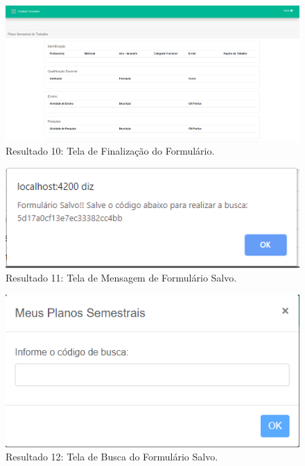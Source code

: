 \begin{figure}[htb]
    \centering
    \includegraphics[width=.8\textwidth]{img/pagina_finalizar.PNG}
    \caption[Resultado 10: Tela de Finalização do Formulário]{Resultado 10: Tela de Finalização do Formulário.}
    \label{fig:result10}
\end{figure}

\begin{figure}[htb]
    \centering
    \includegraphics[width=.8\textwidth]{img/alert_salvar.PNG}
    \caption[Resultado 11: Tela de Mensagem de Formulário Salvo]{Resultado 11: Tela de Mensagem de Formulário Salvo.}
    \label{fig:result11}
\end{figure}

\begin{figure}[htb]
    \centering
    \includegraphics[width=.8\textwidth]{img/pagina_busca.PNG}
    \caption[Resultado 12: Tela de Busca do Formulário Salvo]{Resultado 12: Tela de Busca do Formulário Salvo.}
    \label{fig:result12}
\end{figure}
